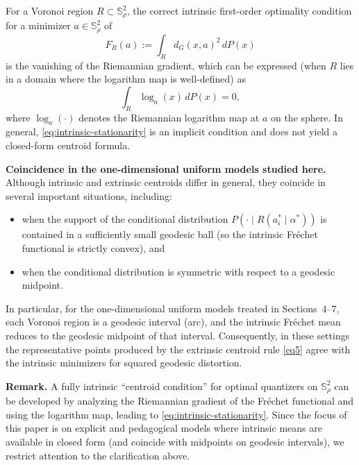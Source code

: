 \documentclass[12pt, reqno]{amsart}
\theoremstyle{plain}
\theoremstyle{definition}
\newcommand{\D}[1]{\mathbb{#1}}%
\begin{document}
For a Voronoi region $R\subset \D S^2_\rho$, the correct intrinsic first-order optimality condition for a
minimizer $a\in\D S^2_\rho$ of
\[
F_R(a):=\int_R d_G(x,a)^2\,dP(x)
\]
is the vanishing of the Riemannian gradient, which can be expressed (when $R$ lies in a domain where the
logarithm map is well-defined) as 
\begin{equation} \label{eq:intrinsic-stationarity} 
\int_R \log_a(x)\,dP(x)=0,
\end{equation}
where $\log_a(\cdot)$ denotes the Riemannian logarithm map at $a$ on the sphere.
In general, \eqref{eq:intrinsic-stationarity} is an implicit condition and does not yield a closed-form
centroid formula.

\medskip
\noindent\textbf{Coincidence in the one-dimensional uniform models studied here.}
Although intrinsic and extrinsic centroids differ in general, they coincide in several important
situations, including:
\begin{itemize}
\item when the support of the conditional distribution $P(\cdot\mid R(a_i^*\mid \alpha^*))$ is contained
in a sufficiently small geodesic ball (so the intrinsic Fr\'echet functional is strictly convex), and
\item when the conditional distribution is symmetric with respect to a geodesic midpoint.
\end{itemize}
In particular, for the one-dimensional uniform models treated in Sections~4--7, each Voronoi region is a
geodesic interval (arc), and the intrinsic Fr\'echet mean reduces to the geodesic midpoint of that
interval. Consequently, in these settings the representative points produced by the extrinsic centroid
rule \eqref{eq5} agree with the intrinsic minimizers for squared geodesic distortion.

\medskip
\noindent\textbf{Remark.}
A fully intrinsic ``centroid condition'' for optimal quantizers on $\D S^2_\rho$ can be developed by
analyzing the Riemannian gradient of the Fr\'echet functional and using the logarithm map, leading to
\eqref{eq:intrinsic-stationarity}. Since the focus of this paper is on explicit and pedagogical models
where intrinsic means are available in closed form (and coincide with midpoints on geodesic intervals),
we restrict attention to the clarification above.
\end{document}
